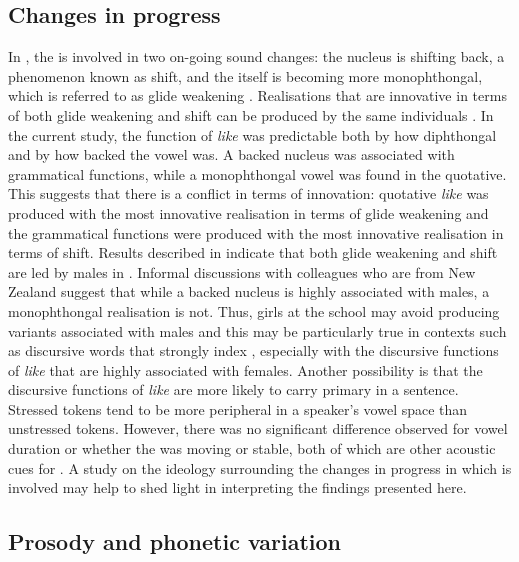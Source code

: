 \subsection{Changes in progress}
In , the   is involved in two on-going sound changes: the nucleus is shifting back, a phenomenon known as  shift, \citep[149]{onzebook} and the  itself is becoming more monophthongal, which is referred to as glide weakening \citep{onzebook,chartres2008}. Realisations that are innovative in terms of both glide weakening and  shift can be produced by the same individuals \citep{chartres2008}. In the current study, the function of \textit{like} was predictable both by how diphthongal and by how backed the vowel was. A backed nucleus was associated with grammatical functions, while a monophthongal vowel was found in the quotative. This suggests that there is a conflict in terms of innovation: quotative \textit{like} was produced with the most innovative realisation in terms of glide weakening and the grammatical functions were produced with the most innovative realisation in terms of  shift. Results described in \citet{chartres2008} indicate that both glide weakening and  shift are led by males in . Informal discussions with colleagues who are from New Zealand suggest that while a backed nucleus is highly associated with males, a monophthongal realisation is not. Thus, girls at the school may avoid producing variants associated with males and this may be particularly true in contexts such as discursive words that strongly index , especially with the discursive functions of \textit{like} that are highly associated with females. Another possibility is that the discursive functions of \textit{like} are more likely to carry primary  in a sentence. Stressed tokens tend to be more peripheral in a speaker's vowel space than unstressed tokens. However, there was no significant difference observed for vowel duration or whether the  was moving or stable, both of which are other acoustic cues for . A study on the ideology surrounding the changes in progress in which  is involved may help to shed light in interpreting the findings presented here.

\subsection{Prosody and phonetic variation}\label{sec:prosody}

